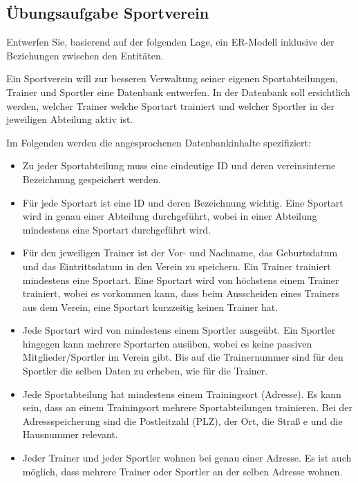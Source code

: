       \subsection{Übungsaufgabe Sportverein}
        Entwerfen Sie, basierend auf der folgenden Lage, ein ER-Modell inklusive der Beziehungen zwischen
        den Entit\"{a}ten.

        Ein Sportverein will zur besseren Verwaltung seiner eigenen Sportabteilungen, Trainer und
        Sportler eine Datenbank entwerfen. In der Datenbank soll ersichtlich werden, welcher Trainer
        welche Sportart trainiert und welcher Sportler in der jeweiligen Abteilung aktiv ist.

        Im Folgenden werden die angesprochenen Datenbankinhalte spezifiziert:
        \begin{itemize}
          \item Zu jeder Sportabteilung muss eine eindeutige ID und deren vereinsinterne
          Bezeichnung gespeichert werden.
          \item Für jede Sportart ist eine ID und deren Bezeichnung wichtig. Eine Sportart wird in genau einer
          Abteilung durchgeführt, wobei in einer Abteilung mindestens eine Sportart durchgeführt wird.
          \item Für den jeweiligen Trainer ist der Vor- und Nachname, das Geburtsdatum
          und das Eintrittsdatum in den Verein zu speichern. Ein Trainer trainiert mindestens eine Sportart.
          Eine Sportart wird von höchstens einem Trainer trainiert, wobei es vorkommen kann, dass beim
          Ausscheiden eines Trainers aus dem Verein, eine Sportart kurzzeitig keinen Trainer hat.
          \item Jede Sportart wird von mindestens einem Sportler ausgeübt. Ein Sportler hingegen kann mehrere
          Sportarten ausüben, wobei es keine passiven Mitglieder/Sportler im Verein gibt. Bis auf die
          Trainernummer sind für den Sportler die selben Daten zu erheben, wie für die Trainer.
          \item Jede Sportabteilung hat mindestens einem Trainingsort (Adresse). Es kann sein, dass an
          einem Trainingsort mehrere Sportabteilungen trainieren. Bei der Adressspeicherung sind die
          Postleitzahl (PLZ), der Ort, die Straß e und die Hausnummer relevant.
          \item Jeder Trainer und jeder Sportler wohnen bei genau einer Adresse. Es ist auch möglich,
          dass mehrere Trainer oder Sportler an der selben Adresse wohnen.
        \end{itemize}
\clearpage
